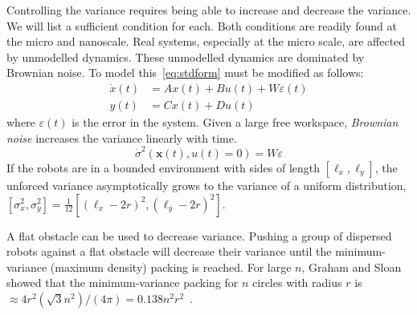 Controlling the variance requires being able to increase and decrease the variance.  We will list a sufficient condition for each. Both conditions are readily found at the micro and nanoscale. 
Real systems, especially at the micro scale, are affected by unmodelled dynamics. These unmodelled dynamics are dominated by Brownian noise. To model this~\eqref{eq:stdform} must be modified as follows:
\begin{align}
\dot{x}(t)  &=  A x(t) + B u(t) + W \varepsilon(t)\\
y(t) &= C x(t) + D u(t)\nonumber
\end{align}
where $\varepsilon(t)$ is the error in the system. Given a large free workspace, \emph{Brownian noise} increases the variance linearly with time.
\begin{equation*}\dot{\sigma}^2(\mathbf{x}(t), u(t) = 0)  = W \varepsilon \end{equation*}
If the robots are in a bounded environment with sides of length $[\ell_x, \ell_y]$, the unforced variance asymptotically grows to the variance of a uniform distribution,
$[\sigma_x^2,\sigma_y^2] = \frac{1}{12}[ (\ell_x - 2 r)^2,(\ell_y - 2 r)^2]$.

 A flat obstacle can be used to decrease variance. Pushing a group of dispersed robots against a flat obstacle will decrease their variance until the minimum-variance (maximum density) packing  is reached. For large $n$, Graham and Sloan showed that the minimum-variance packing for $n$ circles with radius $r$ is $\approx 4 r^2 (\sqrt{3} n^2)/(4 \pi)=0.138 n^2 r^2$~\cite{graham1990penny}. 

